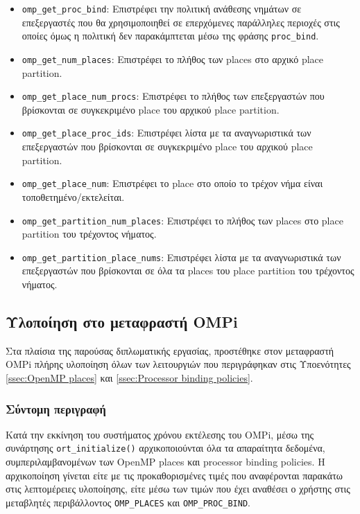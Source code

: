 \begin{itemize}
	\item \texttt{omp\_get\_proc\_bind}:	Επιστρέφει την πολιτική ανάθεσης νημάτων σε επεξεργαστές που θα χρησιμοποιηθεί σε επερχόμενες παράλληλες περιοχές στις οποίες όμως η πολιτική δεν παρακάμπτεται μέσω της φράσης \texttt{proc\_bind}.
	\item \texttt{omp\_get\_num\_places}: Επιστρέφει το πλήθος των places στο αρχικό place partition.
	\item \texttt{omp\_get\_place\_num\_procs}: Επιστρέφει το πλήθος των επεξεργαστών που βρίσκονται σε συγκεκριμένο place του αρχικού place partition.
	\item \texttt{omp\_get\_place\_proc\_ids}: Επιστρέφει λίστα με τα αναγνωριστικά των επεξεργαστών που βρίσκονται σε συγκεκριμένο place του αρχικού place partition.
	\item \texttt{omp\_get\_place\_num}: Επιστρέφει το place στο οποίο το τρέχον νήμα είναι τοποθετημένο/εκτελείται.
	\item \texttt{omp\_get\_partition\_num\_places}: Επιστρέφει το πλήθος των places στο place partition του τρέχοντος νήματος.
	\item \texttt{omp\_get\_partition\_place\_nums}: Επιστρέφει λίστα με τα αναγνωριστικά των επεξεργαστών που βρίσκονται σε όλα τα places του place partition του τρέχοντος νήματος.
\end{itemize}

\subsection{Υλοποίηση στο μεταφραστή OMPi}
Στα πλαίσια της παρούσας διπλωματικής εργασίας, προστέθηκε στον μεταφραστή OMPi πλήρης υλοποίηση όλων των λειτουργιών που περιγράφηκαν στις Υποενότητες \ref{ssec:OpenMP places} και \ref{ssec:Processor binding policies}.

\subsubsection{Σύντομη περιγραφή}
Κατά την εκκίνηση του συστήματος χρόνου εκτέλεσης του OMPi, μέσω της συνάρτησης \texttt{ort\_initialize()} αρχικοποιούνται όλα τα απαραίτητα δεδομένα, συμπεριλαμβανομένων των OpenMP places και processor binding policies. Η αρχικοποίηση γίνεται είτε με τις προκαθορισμένες τιμές που αναφέρονται παρακάτω στις λεπτομέρειες υλοποίησης, είτε μέσω των τιμών που έχει αναθέσει ο χρήστης στις μεταβλητές περιβάλλοντος \texttt{OMP\_PLACES} και \texttt{OMP\_PROC\_BIND}.

